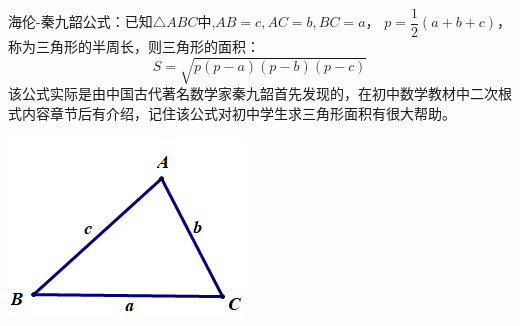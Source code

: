 \documentclass[10pt]{ctexart}
\begin{document}
\begin{minipage}[t]{0.7\textwidth}
\begin{dkli}{}{}
海伦-秦九韶公式：已知$\triangle ABC$中,$AB=c,AC=b,BC=a$，
$p=\dfrac{1}{2}(a+b+c)$，称为三角形的半周长，则三角形的面积：
\[S=\sqrt{p(p-a)(p-b)(p-c)}\]
该公式实际是由中国古代著名数学家秦九韶首先发现的，在初中数学教材中二次根式内容章节后有介绍，记住该公式对初中学生求三角形面积有很大帮助。
\end{dkli}
\end{minipage}
\begin{minipage}[t]{0.3\textwidth}
\includegraphics[scale=0.6]{figure/mj-03.png}
\end{minipage}
\end{document}

